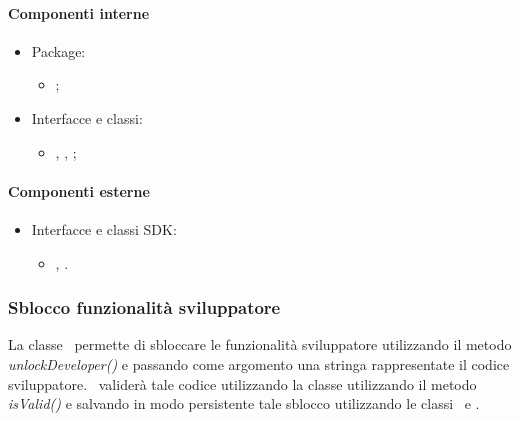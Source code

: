 \documentclass[../Funzionalita.tex]{subfiles}
\begin{document}
			\paragraph*{Componenti interne}
			\begin{itemize}
			
				\item Package:
				\begin{itemize}
					\item[] \usersetting;
				\end{itemize}
				
				\item Interfacce e classi:
				\begin{itemize}
					\item[] \Setting, \SettingImp, \PathPreference;
				\end{itemize}
				
			\end{itemize}
			
			
			\paragraph*{Componenti esterne}
			
			\begin{itemize}
				\item Interfacce e classi SDK:
				\begin{itemize}
					\item[] \SharedPreference, \SharedPreferenceEditor.
				\end{itemize}
			\end{itemize}
						
		
		\subsubsection{Sblocco funzionalità sviluppatore}
			La classe \SettingImp\ permette di sbloccare le funzionalità sviluppatore utilizzando il metodo \textit{unlockDeveloper()} e passando come argomento una stringa rappresentate il codice sviluppatore. \SettingImp\ validerà tale codice utilizzando la classe \DeveloperCodeManager utilizzando il metodo \textit{isValid()} e salvando in modo persistente tale sblocco utilizzando le classi \SharedPreference\ e \SharedPreferenceEditor.
		
\end{document}

